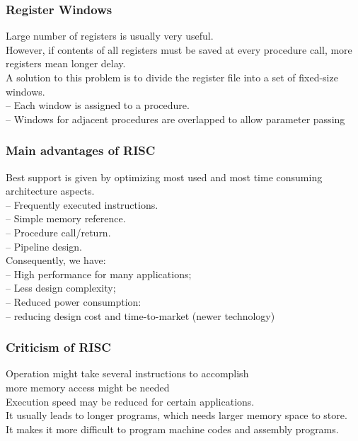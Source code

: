 \documentclass[titlepage, a4paper]{article}
\begin{document}
\subsubsection{Register Windows}
Large number of registers is usually very useful. \\
However, if contents of all registers must be saved at every procedure call, more registers mean longer delay. \\
A solution to this problem is to divide the register file into a
set of fixed-size windows. \\
-- Each window is assigned to a procedure. \\
-- Windows for adjacent procedures are overlapped to allow parameter passing \\

\subsubsection{Main advantages of RISC}
Best support is given by optimizing most used and most time consuming architecture aspects.\\
-- Frequently executed instructions. \\
-- Simple memory reference. \\
-- Procedure call/return. \\
-- Pipeline design. \\
Consequently, we have: \\
-- High performance for many applications;  \\
-- Less design complexity; \\
-- Reduced power consumption: \\
-- reducing design cost and time-to-market (newer technology) \\

\subsubsection{Criticism of RISC}
Operation might take several instructions to accomplish \\
more memory access might be needed \\
Execution speed may be reduced for certain applications. \\

It usually leads to longer programs, which needs larger memory space to store. \\
It makes it more difficult to program machine codes and assembly programs. \\
\end{document}
